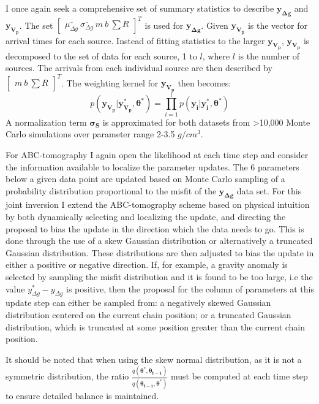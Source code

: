 I once again seek a comprehensive set of summary statistics to describe $\bm{y_{\Delta g}}$ and $\bm{y_{V_p}}$. The set $\begin{bmatrix}
\bar{\mu_{\Delta g}}\ \bar{\sigma_{\Delta g}}\ m\ b\ \sum R
\end{bmatrix}^T$ is used for $\bm{y_{\Delta g}}$. Given $\bm{y_{V_p}}$ is the vector for arrival times for each source. Instead of fitting statistics to the larger $\bm{y_{V_p}}$, $\bm{y_{V_p}}$ is decomposed to the set of data for each source, 1 to $l$, where $l$ is the number of sources. The arrivals from each individual source are then described by $\begin{bmatrix}
m\ b\ \sum R
\end{bmatrix}^T$. The weighting kernel for $\bm{y_{V_p}}$ then becomes:
\begin{equation}
	p(\bm{y_{V_p}}|\bm{y^*_{V_p}},\bm{\theta^*}) = \prod_{i = 1}^{l} p(\bm{y_i}|\bm{y^*_i},\bm{\theta^*})
\end{equation}
A normalization term $\bm{\sigma_S}$ is approximated for both datasets from >10,000 Monte Carlo simulations over parameter range 2-3.5 $g/cm^3$. \par

For ABC-tomography I again open the likelihood at each time step and consider the information available to localize the parameter updates. The 6 parameters below a given data point are updated based on Monte Carlo sampling of a probability distribution proportional to the misfit of the $\bm{y_{\Delta g}}$ data set. For this joint inversion I extend the ABC-tomography scheme based on physical intuition by both dynamically selecting and localizing the update, and directing the proposal to bias the update in the direction which the data needs to go. This is done through the use of a skew Gaussian distribution or alternatively a truncated Gaussian distribution. These distributions are then adjusted to bias the update in either a positive or negative direction. If, for example, a gravity anomaly is selected by sampling the misfit distribution and it is found to be too large, i.e the value $y^*_{\Delta g} - y_{\Delta g}$ is positive, then the proposal for the column of parameters at this update step can either be sampled from: a negatively skewed Gaussian distribution centered on the current chain position; or a truncated Gaussian distribution, which is truncated at some position greater than the current chain position. \par
It should be noted that when using the skew normal distribution, as it is not a symmetric distribution, the ratio $\frac{q(\bm{\theta^*},\bm{\theta_{t-1}})}{q(\bm{\theta_{t-1}},\bm{\theta^*})}$ must be computed at each time step to ensure detailed balance is maintained. \par

